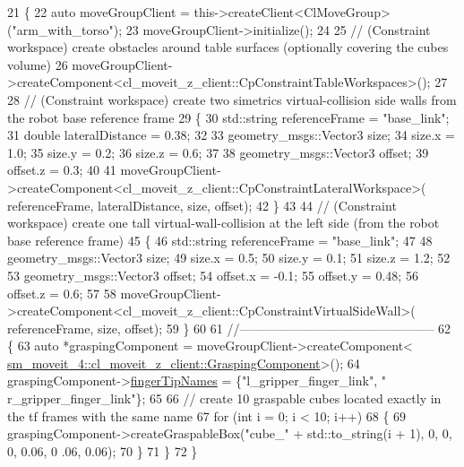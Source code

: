 \begin{DoxyCode}
21         \{
22             \textcolor{keyword}{auto} moveGroupClient = this->createClient<ClMoveGroup>(\textcolor{stringliteral}{"arm\_with\_torso"});
23             moveGroupClient->initialize();
24 
25             \textcolor{comment}{// (Constraint workspace) create obstacles around table surfaces (optionally covering the cubes
       volume)}
26             moveGroupClient->createComponent<cl\_moveit\_z\_client::CpConstraintTableWorkspaces>();
27 
28             \textcolor{comment}{// (Constraint workspace) create two simetrics virtual-collision side walls from the robot base
       reference frame}
29             \{
30                 std::string referenceFrame = \textcolor{stringliteral}{"base\_link"};
31                 \textcolor{keywordtype}{double} lateralDistance = 0.38;
32 
33                 geometry\_msgs::Vector3 size;
34                 size.x = 1.0;
35                 size.y = 0.2;
36                 size.z = 0.6;
37 
38                 geometry\_msgs::Vector3 offset;
39                 offset.z = 0.3;
40 
41                 moveGroupClient->createComponent<cl\_moveit\_z\_client::CpConstraintLateralWorkspace>(
      referenceFrame, lateralDistance, size, offset);
42             \}
43 
44             \textcolor{comment}{// (Constraint workspace) create one tall virtual-wall-collision at the left side (from the
       robot base reference frame)}
45             \{
46                 std::string referenceFrame = \textcolor{stringliteral}{"base\_link"};
47 
48                 geometry\_msgs::Vector3 size;
49                 size.x = 0.5;
50                 size.y = 0.1;
51                 size.z = 1.2;
52 
53                 geometry\_msgs::Vector3 offset;
54                 offset.x = -0.1;
55                 offset.y = 0.48;
56                 offset.z = 0.6;
57 
58                 moveGroupClient->createComponent<cl\_moveit\_z\_client::CpConstraintVirtualSideWall>(
      referenceFrame, size, offset);
59             \}
60 
61             \textcolor{comment}{//-----------------------------------------------}
62             \{
63                 \textcolor{keyword}{auto} *graspingComponent = moveGroupClient->createComponent<
      \hyperlink{classmoveit__z__client_1_1GraspingComponent}{sm\_moveit\_4::cl\_moveit\_z\_client::GraspingComponent}>();
64                 graspingComponent->\hyperlink{classmoveit__z__client_1_1GraspingComponent_a1a3da6af2dcf6e815042c5d892875412}{fingerTipNames} = \{\textcolor{stringliteral}{"l\_gripper\_finger\_link"}, \textcolor{stringliteral}{"
      r\_gripper\_finger\_link"}\};
65 
66                 \textcolor{comment}{// create 10 graspable cubes located exactly in the tf frames with the same name }
67                 \textcolor{keywordflow}{for} (\textcolor{keywordtype}{int} i = 0; i < 10; i++)
68                 \{
69                     graspingComponent->createGraspableBox(\textcolor{stringliteral}{"cube\_"} + std::to\_string(i + 1), 0, 0, 0, 0.06, 0
      .06, 0.06);
70                 \}
71             \}
72         \}
\end{DoxyCode}



